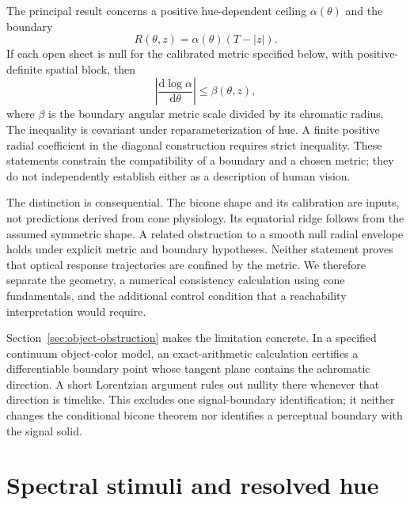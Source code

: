 \documentclass[9pt,twocolumn,twoside]{opticajnl}
\theoremstyle{plain}
\newcommand{\dd}{\mathrm{d}}
\begin{document}
The principal result concerns a positive hue-dependent ceiling $\alpha(\theta)$ and the boundary
\begin{equation}
 R(\theta,z)=\alpha(\theta)(T-|z|).
 \label{eq:boundary-intro}
\end{equation}
If each open sheet is null for the calibrated metric specified below, with positive-definite spatial block, then
\begin{equation}
 \left|\frac{\dd\log\alpha}{\dd\theta}\right|\leq\beta(\theta,z),
 \label{eq:bound-intro}
\end{equation}
where $\beta$ is the boundary angular metric scale divided by its chromatic radius. The inequality is covariant under reparameterization of hue. A finite positive radial coefficient in the diagonal construction requires strict inequality. These statements constrain the compatibility of a boundary and a chosen metric; they do not independently establish either as a description of human vision.

The distinction is consequential. The bicone shape and its calibration are inputs, not predictions derived from cone physiology. Its equatorial ridge follows from the assumed symmetric shape. A related obstruction to a smooth null radial envelope holds under explicit metric and boundary hypotheses. Neither statement proves that optical response trajectories are confined by the metric. We therefore separate the geometry, a numerical consistency calculation using cone fundamentals, and the additional control condition that a reachability interpretation would require.

Section~\ref{sec:object-obstruction} makes the limitation concrete. In a specified continuum object-color model, an exact-arithmetic calculation certifies a differentiable boundary point whose tangent plane contains the achromatic direction. A short Lorentzian argument rules out nullity there whenever that direction is timelike. This excludes one signal-boundary identification; it neither changes the conditional bicone theorem nor identifies a perceptual boundary with the signal solid.

\section{Spectral stimuli and resolved hue}
\label{sec:hue}
\end{document}

